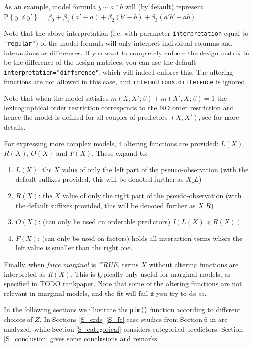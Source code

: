 \documentclass[12pt]{article}
\newcommand{\prob}[1]{\text{P}\left\{#1\right\}}
\newcommand{\leqs}{\preccurlyeq}
\newcommand{\cd}[1]{\texttt{#1}}%
\begin{document}
As an example, model formula $y\sim a*b$ will (by default) represent $\prob{y \leqs y' }=\beta_0+\beta_1  (a'-a) + \beta_2  (b'-b) + \beta_3  (a'b' - ab)$.

Note that the above interpretation (i.e. with parameter \cd{interpretation} equal to \cd{"regular"}) of the model formula will only interpret individual columns and interactions as differences. If you want to completely enforce the design matrix to be the difference of the design matrices, you can use the default \cd{interpretation="difference"}, which will indeed enforce this. The altering functions are not allowed in this case, and \cd{interactions.difference} is ignored.

Note that when the model satisfies $m(X,X';\beta) + m(X',X;\beta) = 1$ the lexicographical order restriction corresponds to the NO order restriction and hence the model is defined for all couples of predictors $(X,X')$, see \cite{Thas2012} for more details. 

For expressing more complex models, 4 altering functions are provided: $L(X)$, $R(X)$, $O(X)$ and $F(X)$. These expand to:
\begin{enumerate}
\item $L(X)$: the $X$ value of only the left part of the pseudo-observation (with the default suffixes provided, this will be denoted further as $X \_ L$)
\item $R(X)$: the $X$ value of only the right part of the pseudo-observation (with the default suffixes provided, this will be denoted further as $X \_ R$)
\item $O(X)$: (can only be used on orderable predictors) $I\left( L(X) \leqs R(X) \right)$
\item $F(X)$: (can only be used on factors) holds all interaction terms where the left value is smaller than the right one.
\end{enumerate} 

Finally, when \emph{force.marginal} is \emph{TRUE}, terms $X$ without altering functions are interpreted as $R(X)$. This is typically only useful for marginal models, as specified in TODO rankpaper. Note that some of the altering functions are not relevant in marginal models, and the fit will fail if you try to do so.

In the following sections we illustrate the \texttt{pim()} function according to different choices of $Z$. In Sections \ref{S_crds}-\ref{S_fe} case studies from Section 6 in \cite{Thas2012} are analyzed, while Section \ref{S_categorical} considers categorical predictors. Section \ref{S_conclusion} gives some conclusions and remarks.  
\end{document}
